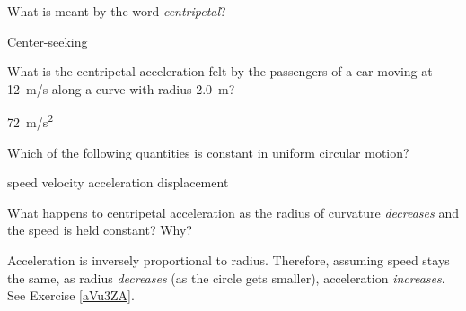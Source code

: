 \documentclass[../main-physics-problems.tex]{subfiles}
\begin{document}
\begin{questions}
\question \label{x2YCzr} %
What is meant by the word \textit{centripetal}?

\begin{solution}
Center-seeking
\end{solution}


\question \label{S4rGIt} %




\question \label{kTvEZX} %
What is the centripetal acceleration felt by the passengers of a car moving at \SI{12}{m/s} along a curve with radius \SI{2.0}{m}?

\begin{solution}
\SI{72}{m/s^2}
\end{solution}




\question \label{fsjtBV} %
Which of the following quantities is constant in uniform circular motion?

\begin{randomizechoices}
    \correctchoice speed
    \choice velocity
    \choice acceleration
    \choice displacement    
\end{randomizechoices}







\question \label{5lauZ6} %
What happens to centripetal acceleration as the radius of curvature \textit{decreases} and the speed is held constant? Why?

\begin{solution}
Acceleration is inversely proportional to radius. Therefore, assuming speed stays the same, as radius \textit{decreases} (as the circle gets smaller), acceleration \textit{increases}. See Exercise \ref{aVu3ZA}.
\end{solution}



\end{questions}
\end{document}
